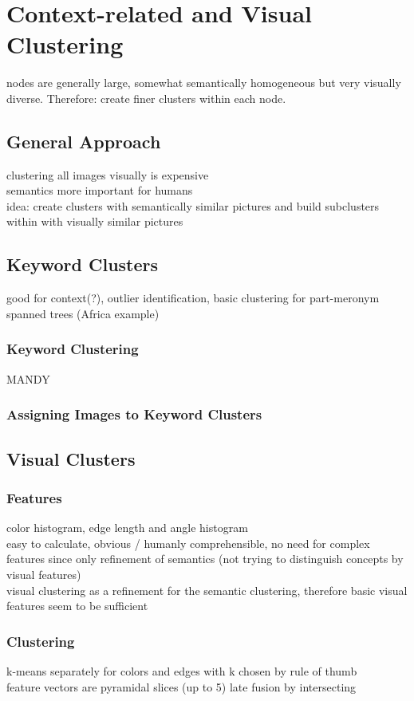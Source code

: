 %
\section{Context-related and Visual Clustering}
\label{sec_inhalt}

nodes are generally large, somewhat semantically homogeneous but very visually diverse. Therefore: create finer clusters within each node.

\subsection{General Approach}
clustering all images visually is expensive \\
semantics more important for humans \\
idea: create clusters with semantically similar pictures and build subclusters within with visually similar pictures

\subsection{Keyword Clusters}
good for context(?), outlier identification, basic clustering for part-meronym spanned trees (Africa example)

\subsubsection{Keyword Clustering}
MANDY
\subsubsection{Assigning Images to Keyword Clusters}


\subsection{Visual Clusters}

\subsubsection{Features}
color  histogram, edge length and angle histogram \\
easy to calculate, obvious / humanly comprehensible, no need for complex features since only refinement of semantics (not trying to distinguish concepts by visual features) \\
visual clustering as a refinement for the semantic clustering, therefore basic visual features seem to be sufficient 


\subsubsection{Clustering}
k-means separately for colors and edges with k chosen by rule of thumb \\
feature vectors are pyramidal slices (up to 5)
late fusion by intersecting
